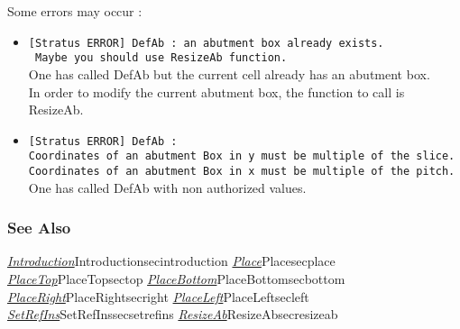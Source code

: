 Some errors may occur :
\begin{itemize}
    \item \verb-[Stratus ERROR] DefAb : an abutment box already exists.-\\\verb- Maybe you should use ResizeAb function.-\\One has called DefAb but the current cell already has an abutment box.\\In order to modify the current abutment box, the function to call is ResizeAb.
    \item \verb-[Stratus ERROR] DefAb :-\\\verb-Coordinates of an abutment Box in y must be multiple of the slice.-\\\verb-Coordinates of an abutment Box in x must be multiple of the pitch.-\\One has called DefAb with non authorized values.
\end{itemize}

\subsubsection{See Also}

\hyperref[ref]{\emph{Introduction}}{}{Introduction}{secintroduction}
\hyperref[ref]{\emph{Place}}{}{Place}{secplace}
\hyperref[ref]{\emph{PlaceTop}}{}{PlaceTop}{sectop}
\hyperref[ref]{\emph{PlaceBottom}}{}{PlaceBottom}{secbottom}
\hyperref[ref]{\emph{PlaceRight}}{}{PlaceRight}{secright}
\hyperref[ref]{\emph{PlaceLeft}}{}{PlaceLeft}{secleft}
\hyperref[ref]{\emph{SetRefIns}}{}{SetRefIns}{secsetrefins}
\hyperref[ref]{\emph{ResizeAb}}{}{ResizeAb}{secresizeab}
